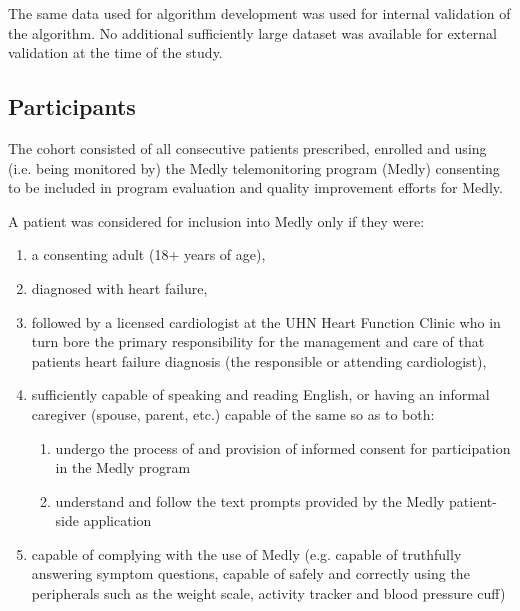 \documentclass[]{article}
\begin{document}
The same data used for algorithm development was used for internal validation of the algorithm. No additional sufficiently large dataset was available for external validation at the time of the study.


\subsection{Participants} %

The cohort consisted of all consecutive patients prescribed, enrolled and using (i.e. being monitored by) the Medly telemonitoring program (Medly) consenting to be included in program evaluation and quality improvement efforts for Medly.

A patient was considered for inclusion into Medly only if they were:
\begin{enumerate}
	\item a consenting adult (18+ years of age), 
	\item diagnosed with heart failure,
	\item followed by a licensed cardiologist at the UHN Heart Function Clinic who in turn bore the primary responsibility for the management and care of that patients heart failure diagnosis (the responsible or attending cardiologist),
	\item sufficiently capable of speaking and reading English, or having an informal caregiver (spouse, parent, etc.) capable of the same so as to both: 
	\begin{enumerate}
		\item undergo the process of and provision of informed consent for participation in the Medly program
		\item understand and follow the text prompts provided by the Medly patient-side application
	\end{enumerate}
	\item capable of complying with the use of Medly (e.g. capable of truthfully answering symptom questions, capable of safely and correctly using the peripherals such as the weight scale, activity tracker and blood pressure cuff)
\end{enumerate}
\end{document}
